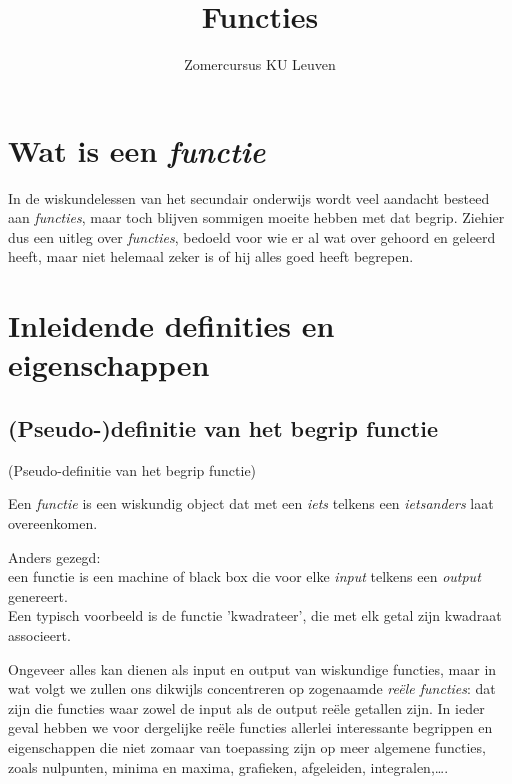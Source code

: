 \documentclass{ximera}
\author{Zomercursus KU Leuven}
\title{Functies}
\begin{document}
	
	\section*{Wat is een \textit{functie}}
\begin{footnotesize}

In de wiskundelessen van het secundair onderwijs wordt veel aandacht besteed aan \textit{functies}, maar toch blijven sommigen moeite hebben met dat begrip. Ziehier dus een uitleg over \textit{functies}, bedoeld voor wie er al wat over gehoord en geleerd heeft, maar niet helemaal zeker is of hij alles goed heeft begrepen.
\end{footnotesize}


\section{Inleidende definities en eigenschappen}

\subsection{(Pseudo-)definitie van het begrip functie}

\begin{definition} (Pseudo-definitie van het begrip functie)
	
Een  \textit{functie} is een wiskundig object dat met een \textit{iets} telkens een \textit{ietsanders} laat overeenkomen. 
\end{definition}

Anders gezegd: \\
een functie is een machine of black box die voor elke \textit{input} telkens een \textit{output} genereert.
\\

Een typisch voorbeeld is de functie 'kwadrateer', die met elk getal zijn kwadraat associeert.

Ongeveer alles kan dienen als input en output van wiskundige functies, maar in wat volgt we zullen ons dikwijls concentreren op zogenaamde \textit{reële functies}: dat zijn die functies waar zowel de input als de output reële getallen zijn. In ieder geval hebben we voor dergelijke reële functies allerlei interessante begrippen en eigenschappen die niet zomaar van toepassing zijn op meer algemene functies, zoals nulpunten, minima en maxima, grafieken, afgeleiden, integralen,\ldots.
\end{document}
